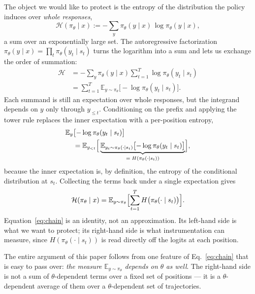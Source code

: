 \documentclass[11pt]{article}
\newcommand{\Htraj}{\mathcal{H}}
\newcommand{\E}{\mathbb{E}}
\newcommand{\pit}{\pi_{\theta}}
\begin{document}
The object we would like to protect is the entropy of the distribution the policy
induces over \emph{whole responses},
%
\begin{equation}
\Htraj(\pit \mid x) := -\sum_{y} \pit(y \mid x)\, \log \pit(y \mid x),
\label{eq:Hdef}
\end{equation}
%
a sum over an exponentially large set. The autoregressive factorization
$\pit(y \mid x) = \prod_t \pit(y_t \mid s_t)$ turns the logarithm into a sum and
lets us exchange the order of summation:
%
\begin{equation}
\begin{split}
\Htraj
&= -\sum_{y} \pit(y \mid x) \sum_{t=1}^{T} \log \pit(y_t \mid s_t)\\
&= \sum_{t=1}^{T} \E_{y \sim \pit}\bigl[-\log \pit(y_t \mid s_t)\bigr].
\end{split}
\label{eq:chainstep}
\end{equation}
%
Each summand is still an expectation over whole responses, but the integrand depends
on $y$ only through $y_{\le t}$. Conditioning on the prefix and applying the tower
rule replaces the inner expectation with a per-position entropy,
%
\begin{equation*}
\begin{split}
\E_{y}&\bigl[-\log \pit(y_t \mid s_t)\bigr]\\
&= \E_{y_{<t}}\Bigl[\,\underbrace{\E_{y_t \sim \pit(\cdot \mid s_t)}\bigl[-\log \pit(y_t \mid s_t)\bigr]}_{= \; H(\pit(\cdot \mid s_t))}\Bigr],
\end{split}
\end{equation*}
%
because the inner expectation is, by definition, the entropy of the conditional
distribution at $s_t$. Collecting the terms back under a single expectation gives
%
\begin{equation}
\Htraj(\pit \mid x)
= \E_{y \sim \pit}\Bigl[\sum_{t=1}^{T} H\bigl(\pit(\cdot \mid s_t)\bigr)\Bigr].
\label{eq:chain}
\end{equation}
%
Equation~\eqref{eq:chain} is an identity, not an approximation. Its left-hand side
is what we want to protect; its right-hand side is what instrumentation can measure,
since $H(\pit(\cdot \mid s_t))$ is read directly off the logits at each position.

The entire argument of this paper follows from one feature of
Eq.~\eqref{eq:chain} that is easy to pass over: \emph{the measure
$\E_{y \sim \pit}$ depends on $\theta$ as well}. The right-hand side is not a sum of
$\theta$-dependent terms over a fixed set of positions --- it is a $\theta$-dependent
average of them over a $\theta$-dependent set of trajectories.
\end{document}
